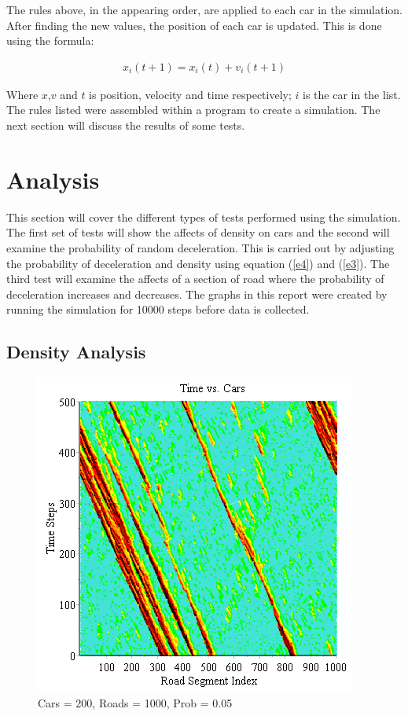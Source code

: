 \documentclass[12pt]{extarticle}
\begin{document}
The rules above, in the appearing order, are applied to each car in the simulation. After finding the new values, the position of each car is updated. This is done using the formula:

\begin{align}
\label{e5}
 x_i(t + 1) = x_i(t) + v_i(t+1)
\end{align}

Where $x$,$v$ and $t$ is position, velocity and time respectively; $i$ is the car in the list. The rules listed were assembled within a program to create a simulation. The next section will discuss the results of some tests.

\section{Analysis}

This section will cover the different types of tests performed using the simulation. The first set of tests will show the affects of density on cars and the second will examine the probability of random deceleration. This is carried out by adjusting the probability of deceleration and density using equation (\ref{e4}) and (\ref{e3}). The third test will examine the affects of a section of road where the probability of deceleration increases and decreases. The graphs in this report were created by running the simulation for 10000 steps before data is collected.

\subsection{Density Analysis}
\begin{figure}[h!]
	\centering
	\includegraphics[scale=0.70]{Graph1.png}
	\caption{Cars = 200, Roads = 1000, Prob = 0.05}
	\label{fig:img1}
\end{figure}
\end{document}
